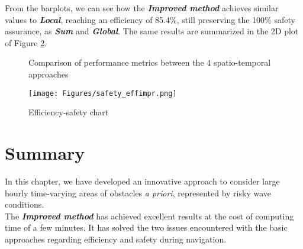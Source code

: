 From the barplots, we can see how the \textbf{\textit{Improved method}} achieves similar values to \textbf{\textit{Local}}, reaching an efficiency of 85.4\%, still preserving the 100\% safety assurance, as \textbf{\textit{Sum}} and \textbf{\textit{Global}}. The same results are summarized in the 2D plot of Figure \ref{safeeffimpr}.
\begin{figure}[H]
	\centering 
	\hspace{0.3cm}
	\vspace{0.0cm}
	\captionsetup{font=footnotesize,labelfont=footnotesize}
	\caption{Comparison of performance metrics between the 4 spatio-temporal approaches} 
	\label{compeffsaf}
\end{figure}
\begin{figure}[h]
	\centering
	\texttt{[image: Figures/safety\_effimpr.png]}
	\caption{Efficiency-safety chart}
	\label{safeeffimpr}
\end{figure} 
\section{Summary}
In this chapter, we have developed an innovative approach to consider large hourly time-varying areas of obstacles \textit{a priori}, represented by risky wave conditions.\\
The \textbf{\textit{Improved method}} has achieved excellent results at the cost of computing time of a few minutes. It has solved the two issues encountered with the basic approaches regarding efficiency and safety during navigation.


